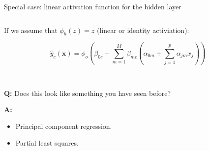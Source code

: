 \documentclass[10pt,ignorenonframetext,]{beamer}
\providecommand{\tightlist}{%
  \setlength{\itemsep}{0pt}\setlength{\parskip}{0pt}}
\begin{document}
\begin{frame}

\begin{block}{Special case: linear activation function for the hidden
layer}

\(~\)

If we assume that \(\phi_h(z)=z\) (linear or identity activiation):

\[
\hat{y}_c({\boldsymbol x})=\phi_o(\beta_{0c}+\sum_{m=1}^M \beta_{mc}(\alpha_{0m}+\sum_{j=1}^p \alpha_{jm}x_{j}))
\]

\(~\) \(~\)

\textbf{Q:} Does this look like something you have seen before?

\textbf{A:}

\begin{itemize}
\tightlist
\item
  Principal component regression.
\item
  Partial least squares.
\end{itemize}

\end{block}

\end{frame}
\end{document}
